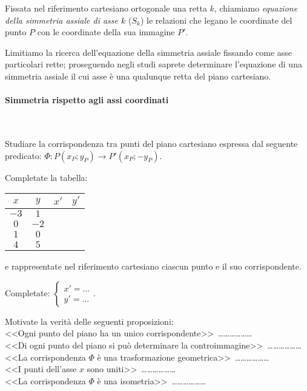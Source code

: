 \begin{definizione}
	Fissata nel riferimento cartesiano ortogonale una retta \(k\), 
	chiamiamo \emph{equazione della simmetria assiale di asse \(k\)} (\(S_k\)) 
	le relazioni che legano le coordinate del punto \(P\) con le coordinate 
	della sua immagine \(P'\).
\end{definizione}

Limitiamo la ricerca dell'equazione della simmetria assiale fissando 
come asse particolari rette; proseguendo negli studi saprete 
determinare l'equazione di una simmetria assiale il cui asse è una 
qualunque retta del piano cartesiano.

\paragraph{Simmetria rispetto agli assi coordinati}
~

\begin{exrig}
	\begin{esempio}
		Studiare la corrispondenza tra punti del piano cartesiano espressa 
		dal seguente predicato: \(\Phi:P(x_P;y_P) \rightarrow 
		P'(x_P;-y_P)\).\vspace{7pt}
		
		Completate la tabella: 
		\begin{center}
			\begin{tabular}{cccc}
				\toprule
				\(x\) & \(y\) & \(x'\) & \(y'\)\\
				\midrule
				\(-3\) & \(1\) &  &  \\
				\(0\) & \(-2\) &  &  \\
				\(1\) & \(0\) & &  \\
				\(4\) & \(5\) & &  \\
				\bottomrule
			\end{tabular}
		\end{center}
		
		\noindent e rappresentate nel riferimento cartesiano ciascun punto e 
		il suo corrispondente.
		
		Completate: \(\begin{cases}x'=\ldots{} \\ y'=\ldots{}\end{cases}\).
		
		Motivate la verità delle seguenti proposizioni:\\
		<<Ogni punto del piano ha un unico 
		corrispondente>>~\ldots\ldots\ldots\ldots\ldots\ldots{}\\
		<<Di ogni punto del piano si può determinare la 
		controimmagine>>~\ldots\ldots\ldots\ldots\ldots\ldots{}\\
		<<La corrispondenza \(\Phi\) è una trasformazione 
		geometrica>>~\ldots\ldots\ldots\ldots\ldots\ldots{}\\
		<<I punti dell'asse \(x\) sono 
		uniti>>~\ldots\ldots\ldots\ldots\ldots\ldots{}\\
		<<La corrispondenza \(\Phi\) è una 
		isometria>>~\ldots\ldots\ldots\ldots\ldots\ldots{}
	\end{esempio}
\end{exrig}

